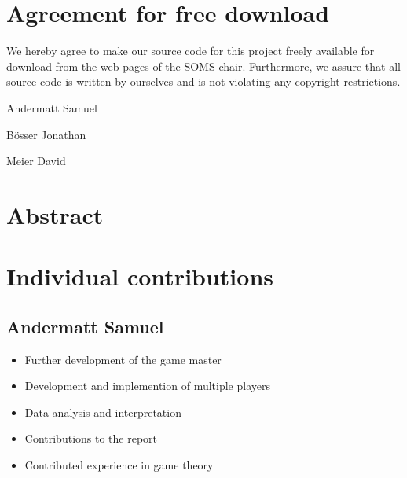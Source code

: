 \documentclass[11pt,twoside]{article}
\begin{document}

\newpage


\newpage
\section*{Agreement for free download}
\bigskip

\bigskip

\large We hereby agree to make our source code for this project freely available for download from the web pages of the SOMS chair. Furthermore, we assure that all source code is written by ourselves and is not violating any copyright restrictions.

\begin{center}
\bigskip\bigskip\bigskip\bigskip\bigskip\bigskip\bigskip\bigskip\bigskip


\large Andermatt Samuel
\bigskip\bigskip\bigskip\bigskip\bigskip\bigskip\bigskip\bigskip\bigskip

\large B\"osser Jonathan
\bigskip\bigskip\bigskip\bigskip\bigskip\bigskip\bigskip\bigskip\bigskip

\large Meier David

\end{center}
\newpage

%

\tableofcontents

\newpage

\renewcommand{\lstlistlistingname}{Matlabcode}
\lstlistoflistings
\cite{lamport94}

\listoffigures
 \listoftables
\newpage
{}
\section{Abstract}

\section{Individual contributions}

\subsection{Andermatt Samuel}
\begin{itemize}
\item Further development of the game master
\item Development and implemention of multiple players 
\item Data analysis and interpretation
\item Contributions to the report
\item Contributed experience in game theory
\end{itemize}
\end{document}
